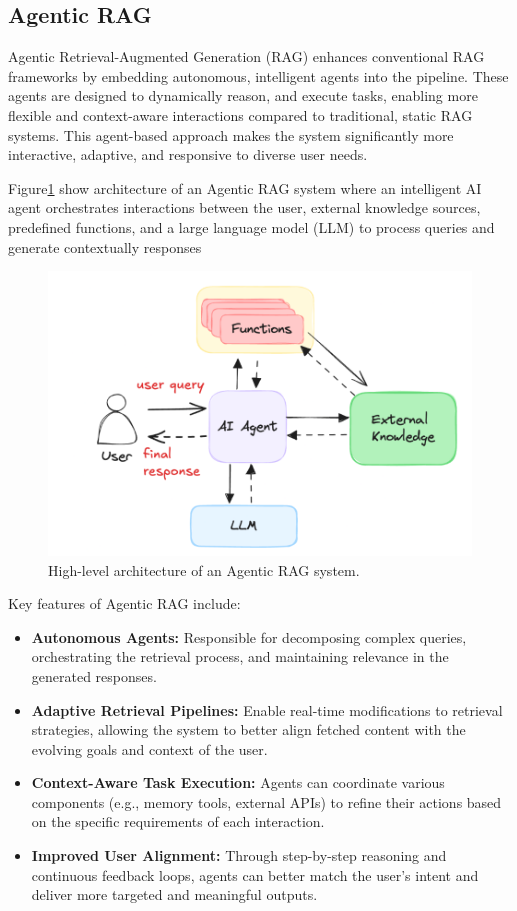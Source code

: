 \subsection{Agentic RAG}

Agentic Retrieval-Augmented Generation (RAG) enhances conventional RAG frameworks by embedding autonomous, intelligent agents into the pipeline. These agents are designed to dynamically reason, and execute tasks, enabling more flexible and context-aware interactions compared to traditional, static RAG systems. This agent-based approach makes the system significantly more interactive, adaptive, and responsive to diverse user needs\citep{ahmed2024agenticrag}.

Figure\ref{rag_agentic} show architecture of an Agentic RAG system  where an intelligent AI agent orchestrates interactions between the user, external knowledge sources, predefined functions, and a large language model (LLM) to process queries and generate contextually  responses
\begin{figure}[h]
	\centering
	\includegraphics[width=0.7\linewidth]{Figures/agenticrag.png}
\caption{High-level architecture of an Agentic RAG system.}

	\label{rag_agentic}
\end{figure}

Key features of Agentic RAG include:
\begin{itemize}
	\item \textbf{Autonomous Agents:} Responsible for decomposing complex queries, orchestrating the retrieval process, and maintaining relevance in the generated responses.
	\item \textbf{Adaptive Retrieval Pipelines:} Enable real-time modifications to retrieval strategies, allowing the system to better align fetched content with the evolving goals and context of the user.
	\item \textbf{Context-Aware Task Execution:} Agents can coordinate various components (e.g., memory tools, external APIs) to refine their actions based on the specific requirements of each interaction.
	\item \textbf{Improved User Alignment:} Through step-by-step reasoning and continuous feedback loops, agents can better match the user’s intent and deliver more targeted and meaningful outputs.
\end{itemize}


